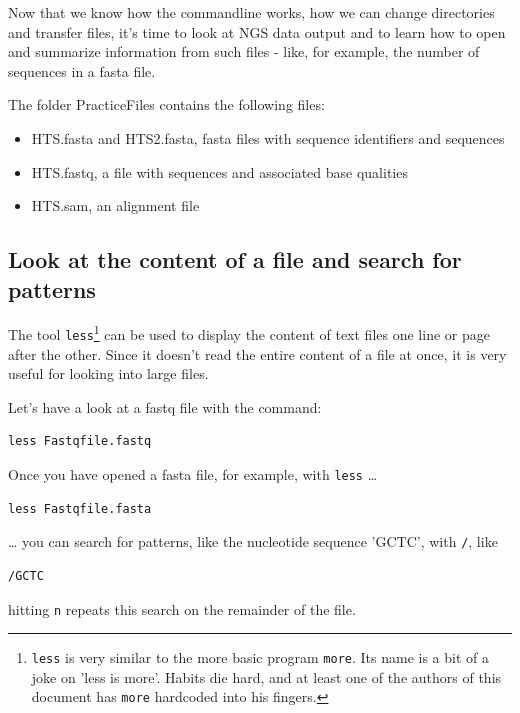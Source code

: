 \documentclass[11pt]{article}
\begin{document}
Now that we know how the commandline works, how we can change
directories and transfer files, it's time to look at NGS data output
and to learn how to open and summarize information from such files -
like, for example, the number of sequences in a fasta file.

The folder PracticeFiles contains the following files:
\begin{itemize}
\item HTS.fasta and HTS2.fasta, fasta files with sequence identifiers and sequences
\item HTS.fastq, a file with sequences and associated base qualities
\item HTS.sam, an alignment file
\end{itemize}

\subsection{Look at the content of a file and search for patterns}
\label{sec:orgheadline20}
The tool \texttt{less}\footnote{\texttt{less} is very similar to the more basic program \texttt{more}. Its
name is a bit of a joke on 'less is more'. Habits die hard, and at
least one of the authors of this document has \texttt{more} hardcoded into
his fingers.} can be used to display the content of text
files one line or page after the other. Since it doesn't read the
entire content of a file at once, it is very useful for looking into
large files.


Let's have a look at a fastq file with the command:

\begin{verbatim}
less Fastqfile.fastq
\end{verbatim}

Once you have opened a fasta file, for example, with \texttt{less} \ldots{}

\begin{verbatim}
less Fastqfile.fasta
\end{verbatim}

\ldots{} you can search for patterns, like the nucleotide sequence 'GCTC', with \texttt{/}, like

\begin{verbatim}
/GCTC
\end{verbatim}

hitting \texttt{n} repeats this search on the remainder of the file.
\end{document}
